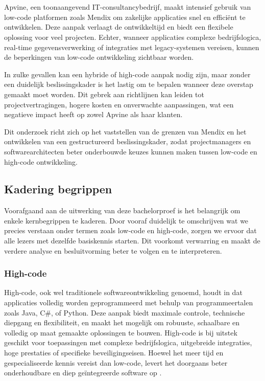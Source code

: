 
\chapter{}%
\label{ch:inleiding}

Apvine, een toonaangevend IT-consultancybedrijf, maakt intensief gebruik van low-code platformen zoals Mendix om zakelijke applicaties snel en efficiënt te ontwikkelen. Deze aanpak verlaagt de ontwikkeltijd en biedt een flexibele oplossing voor veel projecten. Echter, wanneer applicaties complexe bedrijfslogica, real-time gegevensverwerking of integraties met legacy-systemen vereisen, kunnen de beperkingen van low-code ontwikkeling zichtbaar worden.

In zulke gevallen kan een hybride of high-code aanpak nodig zijn, maar zonder een duidelijk beslissingskader is het lastig om te bepalen wanneer deze overstap gemaakt moet worden. Dit gebrek aan richtlijnen kan leiden tot projectvertragingen, hogere kosten en onverwachte aanpassingen, wat een negatieve impact heeft op zowel Apvine als haar klanten.

Dit onderzoek richt zich op het vaststellen van de grenzen van Mendix en het ontwikkelen van een gestructureerd beslissingskader, zodat projectmanagers en softwarearchitecten beter onderbouwde keuzes kunnen maken tussen low-code en high-code ontwikkeling.

\section{Kadering begrippen}
Voorafgaand aan de uitwerking van deze bachelorproef is het belangrijk om enkele kernbegrippen te kaderen. Door vooraf duidelijk te omschrijven wat we precies verstaan onder termen zoals low-code en high-code, zorgen we ervoor dat alle lezers met dezelfde basiskennis starten. Dit voorkomt verwarring en maakt de verdere analyse en besluitvorming beter te volgen en te interpreteren.
\subsection{High-code}
High-code, ook wel traditionele softwareontwikkeling genoemd, houdt in dat applicaties volledig worden geprogrammeerd met behulp van programmeertalen zoals Java, C\#, of Python. Deze aanpak biedt maximale controle, technische diepgang en flexibiliteit, en maakt het mogelijk om robuuste, schaalbare en volledig op maat gemaakte oplossingen te bouwen. High-code is bij uitstek geschikt voor toepassingen met complexe bedrijfslogica, uitgebreide integraties, hoge prestaties of specifieke beveiligingseisen. Hoewel het meer tijd en gespecialiseerde kennis vereist dan low-code, levert het doorgaans beter onderhoudbare en diep geïntegreerde software op
\textcite{Northcutt2023}.
